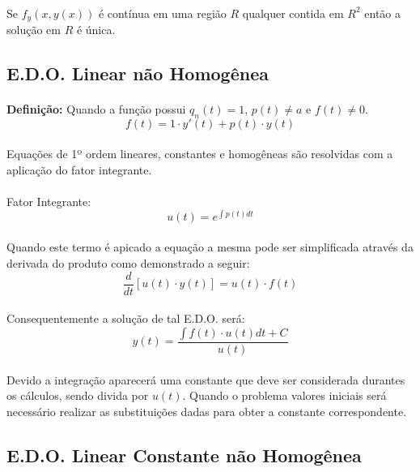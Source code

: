 \documentclass{article}
\begin{document}
        \paragraph{}Se $f_y(x,y(x))$ é contínua em uma região $R$ qualquer contida em $R^2$ então a solução em $R$ é única.
    
    \subsection{E.D.O. Linear não Homogênea}
        \paragraph{}\textbf{Definição:} Quando a função possui $q_{n}(t) = 1$, $p(t) \neq a$ e $f(t) \neq 0$.
            \[f(t) = 1 \cdot y'(t) + p(t) \cdot y(t)\]
        
        \paragraph{}Equações de 1º ordem lineares, constantes e homogêneas são resolvidas com a aplicação do fator integrante.
        \paragraph{}Fator Integrante:
            \[u(t) = e^{\int{p(t)dt}}\]
        \paragraph{}Quando este termo é apicado a equação a mesma pode ser simplificada através da derivada do produto como demonstrado a seguir:
            \[\frac{d}{dt}[u(t) \cdot y(t)] = u(t) \cdot f(t)\]
        \paragraph{}Consequentemente a solução de tal E.D.O. será:
            \[y(t) = \frac{\int{f(t) \cdot u(t) dt + C}}{u(t)}\]
        \paragraph{}Devido a integração aparecerá uma constante que deve ser considerada durantes os cálculos, sendo divida por $u(t)$. Quando o problema valores iniciais será necessário realizar as substituições dadas para obter a constante correspondente.
    
    \subsection{E.D.O. Linear Constante não Homogênea}
\end{document}
